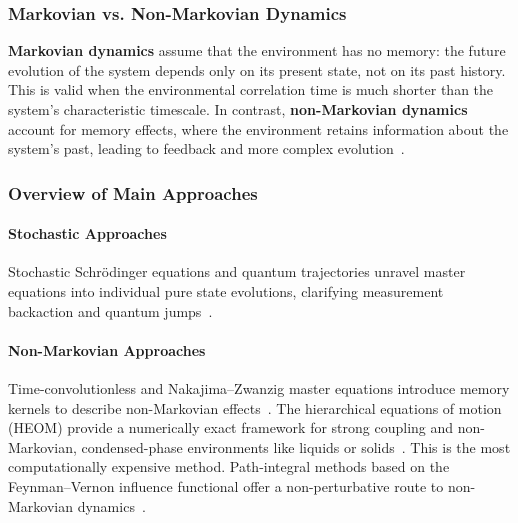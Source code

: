 \subsubsection{Markovian vs. Non-Markovian Dynamics}
\label{subsec:markovian_nonmarkovian}

\noindent
\textbf{Markovian dynamics} assume that the environment has no memory: the future evolution of the system depends only on its present state, not on its past history. This is valid when the environmental correlation time is much shorter than the system's characteristic timescale. In contrast, \textbf{non-Markovian dynamics} account for memory effects, where the environment retains information about the system's past, leading to feedback and more complex evolution~\cite{breuerpetruccione2009theoryopenquantum, rivasetal2014quantumnonmarkovianitycharacterization}.

\subsubsection{Overview of Main Approaches}

\paragraph{Stochastic Approaches}

\noindent
Stochastic Schrödinger equations and quantum trajectories unravel master equations into individual pure state evolutions, clarifying measurement backaction and quantum jumps~\cite{vogtetal2013stochasticblochredfieldtheory, breuerpetruccione2009theoryopenquantum, carmichael1993opensystemsapproach}.

\paragraph{Non-Markovian Approaches}

\noindent
Time-convolutionless and Nakajima–Zwanzig master equations introduce memory kernels to describe non-Markovian effects~\cite{breuerpetruccione2009theoryopenquantum, rivasetal2014quantumnonmarkovianitycharacterization}. The hierarchical equations of motion (HEOM) provide a numerically exact framework for strong coupling and non-Markovian, condensed-phase environments like liquids or solids~\cite{tanimura2020numericallyexactapproach}. This is the most computationally expensive method. Path-integral methods based on the Feynman–Vernon influence functional offer a non-perturbative route to non-Markovian dynamics~\cite{weiss2012quantumdissipativesystems}.

